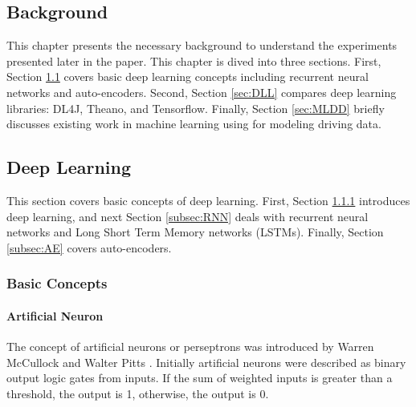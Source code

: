 \documentclass[draft,dvipsnames]{drexel-thesis}
\begin{document}
\begin{thesis}
\chapter{Background}\label{chap:bg}
This chapter presents the necessary background to understand the experiments presented later in the paper. This chapter is dived into three sections. First, Section \ref{sec:DL} covers basic deep learning concepts including recurrent neural networks and auto-encoders. Second, Section \ref{sec:DLL} compares deep learning libraries: DL4J, Theano, and Tensorflow. Finally, Section \ref{sec:MLDD} briefly discusses existing work in machine learning using for modeling driving data.

\section{Deep Learning}\label{sec:DL}
This section covers basic concepts of deep learning. First, Section \ref{subsec:basicDL} introduces deep learning, and next Section \ref{subsec:RNN} deals with recurrent neural networks and Long Short Term Memory networks (LSTMs). Finally, Section \ref{subsec:AE} covers auto-encoders.

\subsection{Basic Concepts}\label{subsec:basicDL}

\subsubsection{Artificial Neuron}\label{subsubsec:AN}
The concept of artificial neurons or perseptrons was introduced by Warren McCullock and Walter Pitts \cite{raschka2015python}. Initially artificial neurons were described as binary output logic gates from inputs. If the sum of weighted inputs is greater than a threshold, the output is 1, otherwise, the output is 0.


\end{thesis}
\end{document}
